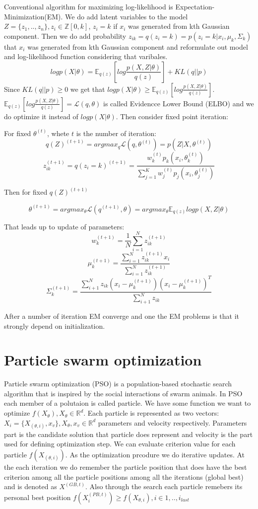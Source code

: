 \documentclass[a4paper]{article}
\begin{document}
Conventional algorithm for maximizing log-likelihood is Expectation-Minimization(EM). We do add latent variables to the model
$Z = \{z_1, .., z_n\}, z_i \in \mathbb{Z}[0, k]$, $z_i =k$ if $x_i$ was generated from kth Gaussian component. Then we do add 
probability $z_{ik} = q(z_i=k) = p(z_i=k|x_i, \mu_k, \Sigma_k)$ that $x_i$ was generated  from kth Gaussian component and
 reformulate out model and log-likelihood function considering that varibales.
 $$logp(X | \theta) = \mathbb{E}_{q(z)}[log\frac{p(X, Z| \theta)}{q(z)}] + KL(q || p)$$
Since $KL(q || p) \geq 0$ we get that $logp(X | \theta) \geq  \mathbb{E}_{q(z)}[log\frac{p(X, Z| \theta)}{q(z)}]$.
 $\mathbb{E}_{q(z)}[log\frac{p(X, Z| \theta)}{q(z)}] = \mathcal{L}(q, \theta)$ is
 called Evidencce Lower Bound (ELBO) and we do optimize it instead of $logp(X | \theta)$. Then consider fixed point iteration:

 For fixed $\theta^{(t)}$, whete $t$ is the number of iteration:
 $$q(Z)^{(t+1)} = argmax_{q}\mathcal{L}(q, \theta^{(t)}) = p(Z | X, \theta^{(t)})$$ 
 $$z_{ik}^{(t+1)} = q(z_i=k)^{(t+1)} = \frac{w_k^{(t)}p_k(x_i, \theta_k^{(t)})}{\sum_{j=1}^Kw_j^{(t)}p_j(x_i, \theta_j^{(t)})}$$

 Then for fixed $q(Z)^{(t+1)}$

$$\theta^{(t+1)} = argmax_{\theta}\mathcal{L}(q^{(t+1)}, \theta) = argmax_{\theta}\mathbb{E}_{q(z)}logp(X, Z|\theta)$$

That leads up to update of parameters:
$$w_{k}^{(t+1)} = \frac{1}{N}\sum_{i=1}^{N}z_{ik}^{(t+1)}$$
$$\mu_k^{(t+1)} = \frac{\sum_{i=1}^Nz_{ik}^{(t+1)} x_i}{\sum_{i=1}^Nz_{ik}^{(t+1)}}$$
$$\Sigma_k^{(t+1)} = \frac{\sum_{i+1}^Nz_{ik}(x_i - \mu_k^{(t+1)})(x_i - \mu_k^{(t+1)})^T}{\sum_{i+1}^Nz_{ik}}$$

After a number of iteration EM converge and one the EM problems is that it strongly depend on initialization.

\section{Particle swarm optimization}

Particle swarm optimization (PSO) is a population-based stochastic search algorithm that is
inspired by the social interactions of swarm animals. In PSO each member of a polutaion is called particle. We have some function we want to optimize 
$f(X_{\theta}), X_{\theta} \in \mathbb{R}^d$. Each particle is represented as two vectors: $X_i = \{X_{(\theta, i)}, x_{v}\}, X_{\theta}, x_{v} \in \mathbb{R}^d$ parameters and velocity respectively.
 Parameters part is 
 the candidate solution that particle does represent and velocity is the part used for defining optimization step. We can evaluate 
 criterion value for each particle $f(X_{(\theta, i)})$. As the optimization prcodure we do iterative updates. 
 At the each iteration we do remember the particle position that does have the best criterion among all the particle positions among all the iterations
  (global best) and is denoted as $X^{(GB, t)}$. Also through the search each particle remebers its personal best position 
  $f(X^{(PB, t)}_i) \geq f(X_{\theta, i}), i \in {1,..,i_{last}}$
\end{document}
